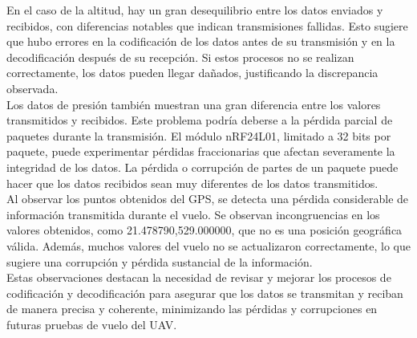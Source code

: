         En el caso de la altitud, hay un gran desequilibrio entre los datos enviados y recibidos, con diferencias notables que indican transmisiones fallidas. Esto sugiere que hubo errores en la codificación de los datos antes de su transmisión y en la decodificación después de su recepción. Si estos procesos no se realizan correctamente, los datos pueden llegar dañados, justificando la discrepancia observada.\\

        Los datos de presión también muestran una gran diferencia entre los valores transmitidos y recibidos. Este problema podría deberse a la pérdida parcial de paquetes durante la transmisión. El módulo nRF24L01, limitado a 32 bits por paquete, puede experimentar pérdidas fraccionarias que afectan severamente la integridad de los datos. La pérdida o corrupción de partes de un paquete puede hacer que los datos recibidos sean muy diferentes de los datos transmitidos.\\

        Al observar los puntos obtenidos del GPS, se detecta una pérdida considerable de información transmitida durante el vuelo. Se observan incongruencias en los valores obtenidos, como 21.478790,529.000000, que no es una posición geográfica válida. Además, muchos valores del vuelo no se actualizaron correctamente, lo que sugiere una corrupción y pérdida sustancial de la información.\\

        Estas observaciones destacan la necesidad de revisar y mejorar los procesos de codificación y decodificación para asegurar que los datos se transmitan y reciban de manera precisa y coherente, minimizando las pérdidas y corrupciones en futuras pruebas de vuelo del UAV.



